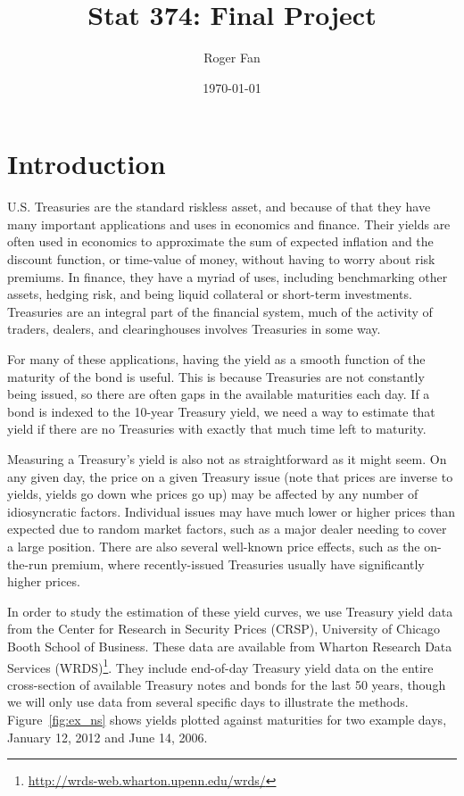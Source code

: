 \documentclass[12pt]{article}
\begin{document}

\title{Stat 374: Final Project}
\author{Roger Fan}
\date{\today}

\maketitle



\section{Introduction}

U.S. Treasuries are the standard riskless asset, and because of that they have many important applications and uses in economics and finance. Their yields are often used in economics to approximate the sum of expected inflation and the discount function, or time-value of money, without having to worry about risk premiums. In finance, they have a myriad of uses, including benchmarking other assets, hedging risk, and being liquid collateral or short-term investments. Treasuries are an integral part of the financial system, much of the activity of traders, dealers, and clearinghouses involves Treasuries in some way.

For many of these applications, having the yield as a smooth function of the maturity of the bond is useful. This is because Treasuries are not constantly being issued, so there are often gaps in the available maturities each day. If a bond is indexed to the 10-year Treasury yield, we need a way to estimate that yield if there are no Treasuries with exactly that much time left to maturity.

Measuring a Treasury's yield is also not as straightforward as it might seem. On any given day, the price on a given Treasury issue (note that prices are inverse to yields, yields go down whe prices go up) may be affected by any number of idiosyncratic factors. Individual issues may have much lower or higher prices than expected due to random market factors, such as a major dealer needing to cover a large position. There are also several well-known price effects, such as the on-the-run premium, where recently-issued Treasuries usually have significantly higher prices.

In order to study the estimation of these yield curves, we use Treasury yield data from the Center for Research in Security Prices (CRSP), University of Chicago Booth School of Business. These data are available from Wharton Research Data Services (WRDS)\footnote{\url{http://wrds-web.wharton.upenn.edu/wrds/}}. They include end-of-day Treasury yield data on the entire cross-section of available Treasury notes and bonds for the last 50 years, though we will only use data from several specific days to illustrate the methods. Figure~\ref{fig:ex_ns} shows yields plotted against maturities for two example days, January 12, 2012 and June 14, 2006.
\end{document}
